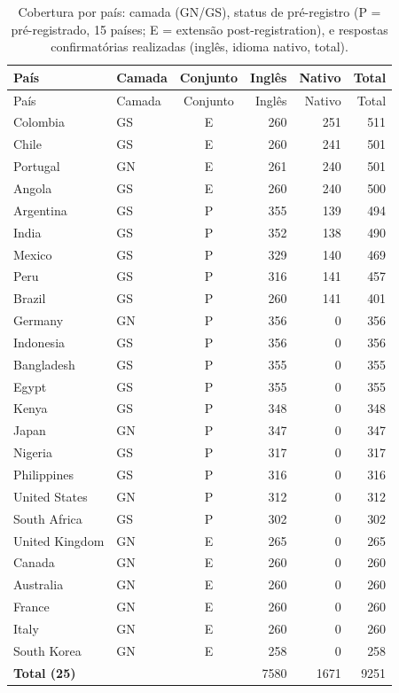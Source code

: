 \begin{longtable}{llcrrr}
\caption{Cobertura por país: camada (GN/GS), status de pré-registro (P = pré-registrado, 15 países; E = extensão post-registration), e respostas confirmatórias realizadas (inglês, idioma nativo, total).\label{tab:s-cov-country}}\\
\toprule
País & Camada & Conjunto & Inglês & Nativo & Total \\
\midrule \endfirsthead
\toprule País & Camada & Conjunto & Inglês & Nativo & Total \\ \midrule \endhead
Colombia & GS & E & 260 & 251 & 511 \\
Chile & GS & E & 260 & 241 & 501 \\
Portugal & GN & E & 261 & 240 & 501 \\
Angola & GS & E & 260 & 240 & 500 \\
Argentina & GS & P & 355 & 139 & 494 \\
India & GS & P & 352 & 138 & 490 \\
Mexico & GS & P & 329 & 140 & 469 \\
Peru & GS & P & 316 & 141 & 457 \\
Brazil & GS & P & 260 & 141 & 401 \\
Germany & GN & P & 356 & 0 & 356 \\
Indonesia & GS & P & 356 & 0 & 356 \\
Bangladesh & GS & P & 355 & 0 & 355 \\
Egypt & GS & P & 355 & 0 & 355 \\
Kenya & GS & P & 348 & 0 & 348 \\
Japan & GN & P & 347 & 0 & 347 \\
Nigeria & GS & P & 317 & 0 & 317 \\
Philippines & GS & P & 316 & 0 & 316 \\
United States & GN & P & 312 & 0 & 312 \\
South Africa & GS & P & 302 & 0 & 302 \\
United Kingdom & GN & E & 265 & 0 & 265 \\
Canada & GN & E & 260 & 0 & 260 \\
Australia & GN & E & 260 & 0 & 260 \\
France & GN & E & 260 & 0 & 260 \\
Italy & GN & E & 260 & 0 & 260 \\
South Korea & GN & E & 258 & 0 & 258 \\
\midrule
\textbf{Total (25)} & & & 7580 & 1671 & 9251 \\
\bottomrule
\end{longtable}
